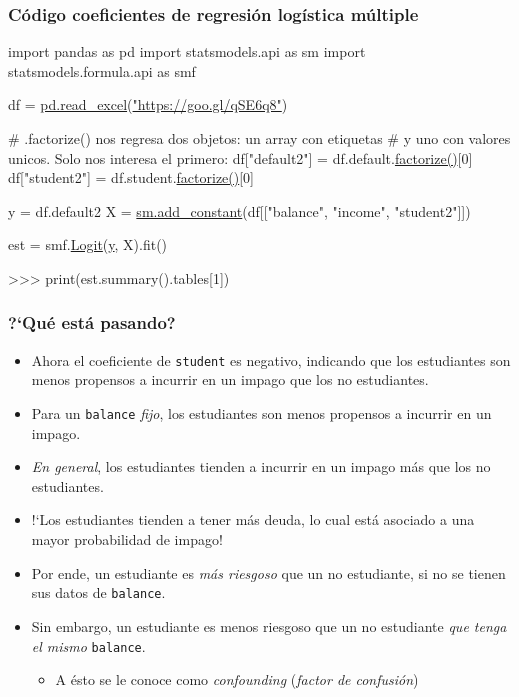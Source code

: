 \documentclass[usenames,dvipsnames]{beamer} %
\newcommand\vari[1]{\textcolor{BrickRed}{\texttt{#1}}}
\newcommand\defi[1]{\textcolor{NavyBlue}{\textit{#1}}}
\begin{document}
\begin{frame}[fragile]\frametitle{C\'odigo coeficientes de regresi\'on log\'istica m\'ultiple}
\begin{semiverbatim}
	\small{\textcolor{deepblue}{import} pandas \textcolor{deepblue}{as} pd
		\textcolor{deepblue}{import} statsmodels.api \textcolor{deepblue}{as} sm
		\textcolor{deepblue}{import} statsmodels.formula.api \textcolor{deepblue}{as} smf
		
		df = \href{https://pandas.pydata.org/pandas-docs/stable/reference/api/pandas.read_excel.html}{pd.read\_excel}(\href{https://goo.gl/qSE6q8}{"https://goo.gl/qSE6q8"})
		
		# .factorize() nos regresa dos objetos: un array con etiquetas
		# y uno con valores unicos. Solo nos interesa el primero:
		df["default2"] = df.default.\href{https://pandas.pydata.org/pandas-docs/version/0.23.4/generated/pandas.factorize.html}{factorize()}[0]
		df["student2"] = df.student.\href{https://pandas.pydata.org/pandas-docs/version/0.23.4/generated/pandas.factorize.html}{factorize()}[0]
		
		y = df.default2
		X = \href{http://www.statsmodels.org/devel/generated/statsmodels.tools.tools.add_constant}{sm.add\_constant}(df[["balance", "income", "student2"]])
		
		est = smf.\href{https://www.statsmodels.org/dev/generated/statsmodels.discrete.discrete_model.Logit.html}{Logit}(\href{https://docs.scipy.org/doc/numpy-1.15.0/reference/generated/numpy.ravel.html}{y}, X).fit()
		
		>>> print(est.summary().tables[1])
	}
\end{semiverbatim}
\end{frame}

\begin{frame}\frametitle{?`Qu\'e est\'a pasando?}
\begin{itemize}
	\item Ahora el coeficiente de \vari{student} es negativo, indicando que los estudiantes son menos propensos a incurrir en un impago que los no estudiantes.
	\item Para un \vari{balance} \textit{fijo}, los estudiantes son menos propensos a incurrir en un impago.
	\item \textit{En general}, los estudiantes tienden a incurrir en un impago m\'as que los no estudiantes.
	\item !`Los estudiantes tienden a tener m\'as deuda, lo cual est\'a asociado a una mayor probabilidad de impago!
	\item Por ende, un estudiante es \textit{m\'as riesgoso} que un no estudiante, si no se tienen sus datos de \vari{balance}.
	\item Sin embargo, un estudiante es menos riesgoso que un no estudiante \textit{que tenga el mismo} \vari{balance}.
	\begin{itemize}
		\item A \'esto se le conoce como \defi{confounding} (\defi{factor de confusi\'on})
	\end{itemize}
\end{itemize}
\end{frame}
\end{document}
